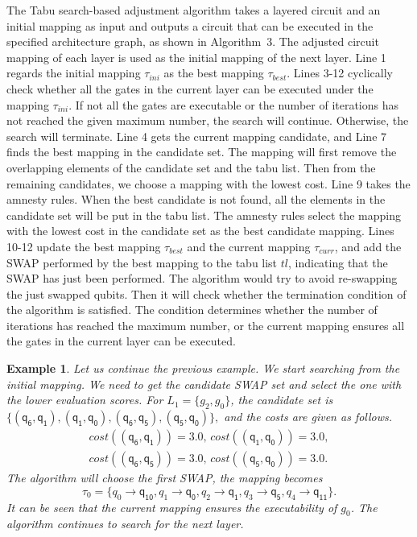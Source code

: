 \documentclass[journal]{IEEEtran}
\newtheorem{example}{Example}
\begin{document}
	The Tabu search-based adjustment algorithm takes a layered circuit and an initial mapping as input and outputs a circuit that can be executed in the specified architecture graph, as shown in Algorithm~3. %
	The adjusted circuit mapping of each layer is used as the initial mapping of the next layer. 
	Line 1 regards the initial mapping $\tau_{ini}$ as the best mapping $\tau_{best}$. Lines 3-12 cyclically check whether all the gates in the current layer can be executed under the mapping $\tau_{ini}$. If not all the gates are executable or the number of iterations has not reached the given maximum number, the search will continue. Otherwise, the search will terminate. Line 4 gets the current mapping candidate, and Line 7 finds the best mapping in the candidate set. The mapping will first remove the overlapping elements of the candidate set and the tabu list. Then from the remaining candidates, we choose a mapping with the lowest cost. Line 9 takes the amnesty rules. When the best candidate is not found, all the elements in the candidate set will be put in the tabu list.  The amnesty rules select the mapping with the lowest cost in the candidate set as the best candidate mapping. Lines 10-12 update the best mapping $\tau_{best}$ and the current mapping $\tau_{curr}$, and add the SWAP performed by the best mapping to the tabu list $tl$, indicating that the SWAP has just been performed. 
	The algorithm would try to avoid re-swapping the just swapped qubits. Then it will check whether the termination condition of the algorithm is satisfied. The condition determines whether the number of iterations has reached the maximum number, or the current mapping ensures all the gates in the current layer can be executed. 
	\begin{example}
		Let us continue the previous example. We start searching from the initial mapping. We need to get the candidate SWAP set and select the one with the lower evaluation scores.
		For $L_{1}=\{g_{2},g_{0}\}$, the candidate set is 
		$\{(\textsf{q}_\textsf{6},\textsf{q}_\textsf{1}), (\textsf{q}_\textsf{1},\textsf{q}_\textsf{0}), (\textsf{q}_\textsf{6},\textsf{q}_\textsf{5}), (\textsf{q}_\textsf{5},\textsf{q}_\textsf{0}) \} , $ and the costs are given as follows.
		\[\begin{array}{l}
			cost((\textsf{q}_\textsf{6},\textsf{q}_\textsf{1}))=3.0, \, cost((\textsf{q}_\textsf{1},\textsf{q}_\textsf{0}))=3.0,\\ cost((\textsf{q}_\textsf{6},\textsf{q}_\textsf{5}))=3.0, \, cost((\textsf{q}_\textsf{5},\textsf{q}_\textsf{0}))=3.0 .
		\end{array}\]
		The algorithm will choose the first SWAP, the mapping becomes $$\tau_{0}=\{\textit{q}_\textit{0}\rightarrow  \textsf{q}_\textsf{10},\textit{q}_\textit{1}\rightarrow  \textsf{q}_\textsf{0},
		\textit{q}_\textit{2}\rightarrow  \textsf{q}_\textsf{1},\textit{q}_\textit{3}\rightarrow  \textsf{q}_\textsf{5},\textit{q}_\textit{4}\rightarrow  \textsf{q}_\textsf{11}\} . $$ 
		It can be seen that the current mapping ensures the executability of $g_{0}$. The algorithm continues to search for the next layer.
	\end{example}
\end{document}
